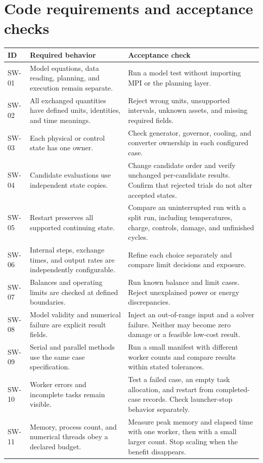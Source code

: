 \documentclass[11pt,a4paper]{report}
\begin{document}
\section{Code requirements and acceptance checks}
\begin{longtable}{L{0.12\textwidth}L{0.40\textwidth}L{0.36\textwidth}}
\toprule ID & Required behavior & Acceptance check \\ \midrule\endhead
SW-01 & Model equations, data reading, planning, and execution remain separate. & Run a model test without importing MPI or the planning layer. \\
SW-02 & All exchanged quantities have defined units, identities, and time meanings. & Reject wrong units, unsupported intervals, unknown assets, and missing required fields. \\
SW-03 & Each physical or control state has one owner. & Check generator, governor, cooling, and converter ownership in each configured case. \\
SW-04 & Candidate evaluations use independent state copies. & Change candidate order and verify unchanged per-candidate results. Confirm that rejected trials do not alter accepted states. \\
SW-05 & Restart preserves all supported continuing state. & Compare an uninterrupted run with a split run, including temperatures, charge, controls, damage, and unfinished cycles. \\
SW-06 & Internal steps, exchange times, and output rates are independently configurable. & Refine each choice separately and compare limit decisions and exposure. \\
SW-07 & Balances and operating limits are checked at defined boundaries. & Run known balance and limit cases. Reject unexplained power or energy discrepancies. \\
SW-08 & Model validity and numerical failure are explicit result fields. & Inject an out-of-range input and a solver failure. Neither may become zero damage or a feasible low-cost result. \\
SW-09 & Serial and parallel methods use the same case specification. & Run a small manifest with different worker counts and compare results within stated tolerances. \\
SW-10 & Worker errors and incomplete tasks remain visible. & Test a failed case, an empty task allocation, and restart from completed-case records. Check launcher-stop behavior separately. \\
SW-11 & Memory, process count, and numerical threads obey a declared budget. & Measure peak memory and elapsed time with one worker, then with a small larger count. Stop scaling when the benefit disappears. \\

\end{longtable}
\end{document}
